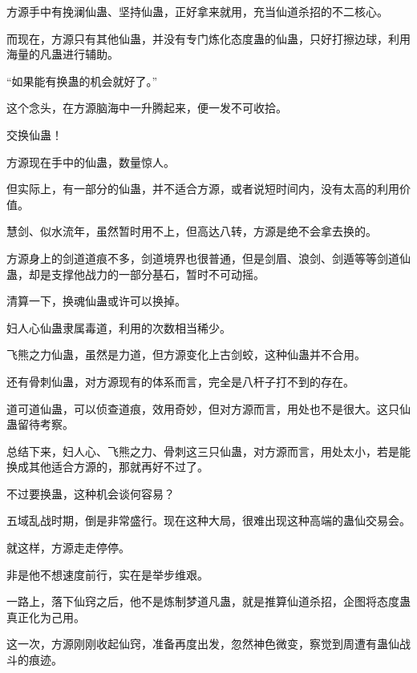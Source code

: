 \begin{this_body}
方源手中有挽澜仙蛊、坚持仙蛊，正好拿来就用，充当仙道杀招的不二核心。

而现在，方源只有其他仙蛊，并没有专门炼化态度蛊的仙蛊，只好打擦边球，利用海量的凡蛊进行辅助。

“如果能有换蛊的机会就好了。”

这个念头，在方源脑海中一升腾起来，便一发不可收拾。

交换仙蛊！

方源现在手中的仙蛊，数量惊人。

但实际上，有一部分的仙蛊，并不适合方源，或者说短时间内，没有太高的利用价值。

慧剑、似水流年，虽然暂时用不上，但高达八转，方源是绝不会拿去换的。

方源身上的剑道道痕不多，剑道境界也很普通，但是剑眉、浪剑、剑遁等等剑道仙蛊，却是支撑他战力的一部分基石，暂时不可动摇。

清算一下，换魂仙蛊或许可以换掉。

妇人心仙蛊隶属毒道，利用的次数相当稀少。

飞熊之力仙蛊，虽然是力道，但方源变化上古剑蛟，这种仙蛊并不合用。

还有骨刺仙蛊，对方源现有的体系而言，完全是八杆子打不到的存在。

道可道仙蛊，可以侦查道痕，效用奇妙，但对方源而言，用处也不是很大。这只仙蛊留待考察。

总结下来，妇人心、飞熊之力、骨刺这三只仙蛊，对方源而言，用处太小，若是能换成其他适合方源的，那就再好不过了。

不过要换蛊，这种机会谈何容易？

五域乱战时期，倒是非常盛行。现在这种大局，很难出现这种高端的蛊仙交易会。

就这样，方源走走停停。

非是他不想速度前行，实在是举步维艰。

一路上，落下仙窍之后，他不是炼制梦道凡蛊，就是推算仙道杀招，企图将态度蛊真正化为己用。

这一次，方源刚刚收起仙窍，准备再度出发，忽然神色微变，察觉到周遭有蛊仙战斗的痕迹。

\end{this_body}

